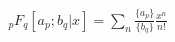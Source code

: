 \documentclass[preview]{standalone}
\begin{document}
\begin{align*}
{}_pF_q[a_p; b_q | x] = \sum_n \frac{\{a_p\}}{\{b_q\}} \frac{x^n}{n!}
\end{align*}
\end{document}
